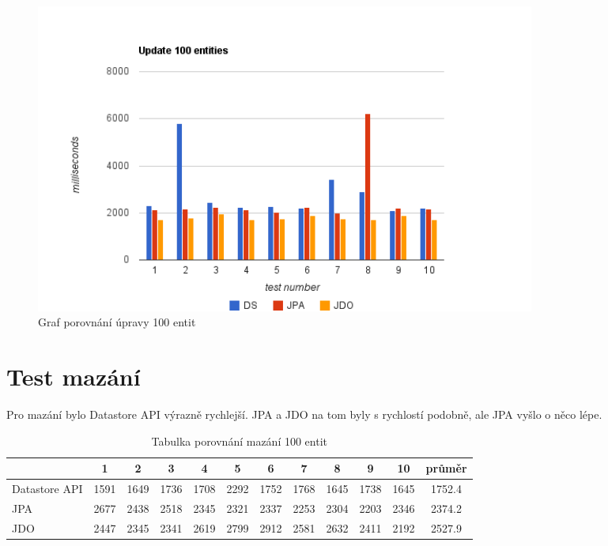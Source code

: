 \begin{figure}[h]
\begin{center}
\includegraphics[width=6.5in]{figures/update.png}
\caption{Graf porovnání úpravy 100 entit}
\label{fig:update}
\end{center}
\end{figure}


\section{Test mazání}

Pro mazání bylo Datastore API výrazně rychlejší. JPA a JDO na tom byly s rychlostí podobně, ale JPA vyšlo o něco lépe.

\begin{table}[h]
\centering
\caption{Tabulka porovnání mazání 100 entit }\label{tab:delete}
\begin{tabular}{|l|c|c|c|c|c|c|c|c|c|c|c|}
   \hline
	& 1		& 2		& 3		& 4		& 5		& 6		& 7		& 8		& 9		& 10		& průměr \\
   \hline
Datastore API	& 1591	& 1649	& 1736	& 1708	& 2292	& 1752	& 1768	& 1645	& 1738	& 1645	& 1752.4 \\
JPA	& 2677	& 2438	& 2518	& 2345	& 2321	& 2337	& 2253	& 2304	& 2203	& 2346	& 2374.2 \\
JDO	& 2447	& 2345	& 2341	& 2619	& 2799	& 2912	& 2581	& 2632	& 2411	& 2192	& 2527.9 \\
   \hline
\end{tabular}
\end{table}

